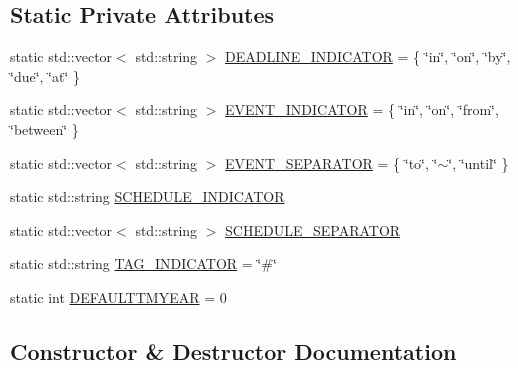 \subsection*{Static Private Attributes}
\begin{DoxyCompactItemize}
\item 
static std\+::vector$<$ std\+::string $>$ \hyperlink{class_do_lah_1_1_task_tokenizer_a8544e1db764064ab0775b7dc20146365}{D\+E\+A\+D\+L\+I\+N\+E\+\_\+\+I\+N\+D\+I\+C\+A\+T\+O\+R} = \{ \char`\"{}in\char`\"{}, \char`\"{}on\char`\"{}, \char`\"{}by\char`\"{}, \char`\"{}due\char`\"{}, \char`\"{}at\char`\"{} \}
\item 
static std\+::vector$<$ std\+::string $>$ \hyperlink{class_do_lah_1_1_task_tokenizer_ac6cb395be71da1b56c8a21702fe8e145}{E\+V\+E\+N\+T\+\_\+\+I\+N\+D\+I\+C\+A\+T\+O\+R} = \{ \char`\"{}in\char`\"{}, \char`\"{}on\char`\"{}, \char`\"{}from\char`\"{}, \char`\"{}between\char`\"{} \}
\item 
static std\+::vector$<$ std\+::string $>$ \hyperlink{class_do_lah_1_1_task_tokenizer_a9014063c9cecbca31aff4c3af27edb75}{E\+V\+E\+N\+T\+\_\+\+S\+E\+P\+A\+R\+A\+T\+O\+R} = \{ \char`\"{}to\char`\"{}, \char`\"{}$\sim$\char`\"{}, \char`\"{}until\char`\"{} \}
\item 
static std\+::string \hyperlink{class_do_lah_1_1_task_tokenizer_a2c004d5ac6e5d8fcfd4e97e70eeaf809}{S\+C\+H\+E\+D\+U\+L\+E\+\_\+\+I\+N\+D\+I\+C\+A\+T\+O\+R}
\item 
static std\+::vector$<$ std\+::string $>$ \hyperlink{class_do_lah_1_1_task_tokenizer_ab0ffb0a1a7b6ef69807a106422bc2796}{S\+C\+H\+E\+D\+U\+L\+E\+\_\+\+S\+E\+P\+A\+R\+A\+T\+O\+R}
\item 
static std\+::string \hyperlink{class_do_lah_1_1_task_tokenizer_ac2e862c393876c5b0d5586e3eaad36e8}{T\+A\+G\+\_\+\+I\+N\+D\+I\+C\+A\+T\+O\+R} = \char`\"{}\#\char`\"{}
\item 
static int \hyperlink{class_do_lah_1_1_task_tokenizer_a23af31ea42cd39b0164e2de0c8ef42c2}{D\+E\+F\+A\+U\+L\+T\+T\+M\+Y\+E\+A\+R} = 0
\end{DoxyCompactItemize}


\subsection{Constructor \& Destructor Documentation}
\hypertarget{class_do_lah_1_1_task_tokenizer_a0ad3177a4ddfaf3f1ef0a85101192125}{}
